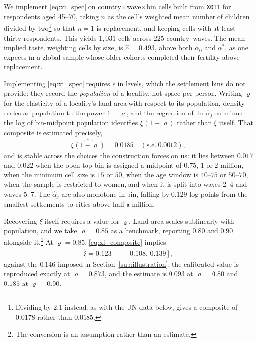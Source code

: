 \documentclass[11pt]{article}
\begin{document}
We implement \eqref{eq:xi_spec} on country$\times$wave$\times$bin cells built from \texttt{X011}
for respondents aged 45--70, taking $n$ as the cell's weighted mean number of children divided by two\footnote{Dividing by
$2.1$ instead, as with the UN data below, gives a composite of $0.0178$ rather than $0.0185$.} so that
$n=1$ is replacement, and keeping cells with at least thirty respondents. This yields $1{,}031$
cells across $225$ country--waves. The mean implied taste, weighting cells by size, is $\hat\alpha=0.493$, above both
$\alpha_0$ and $\alpha^{\ast}$, as one expects in a global sample whose older cohorts completed
their fertility above replacement.

Implementing \eqref{eq:xi_spec} requires $\epsilon$ in levels, which the settlement bins do not
provide: they record the \emph{population} of a locality, not space per person. Writing
$\varrho$ for the elasticity of a locality's land area with respect to its population, density scales
as population to the power $1-\varrho$, and the regression of $\ln\hat\alpha_j$ on minus the log of
bin-midpoint population identifies $\xi(1-\varrho)$ rather than $\xi$ itself. That composite is
estimated precisely,
\begin{align}
\widehat{\xi(1-\varrho)}=0.0185\quad(\text{s.e.}\ 0.0012),
\label{eq:xi_composite}
\end{align}
and is stable across the choices the construction forces on us: it lies between $0.017$ and $0.022$
when the open top bin is assigned a midpoint of $0.75$, $1$ or $2$ million, when the minimum cell
size is $15$ or $50$, when the age window is $40$--$75$ or $50$--$70$, when the sample is restricted
to women, and when it is split into waves 2--4 and waves 5--7. The $\hat\alpha_j$ are also monotone
in bin, falling by $0.129$ log points from the smallest settlements to cities above half a million.

Recovering $\xi$ itself requires a value for $\varrho$. Land area scales sublinearly with population,
and we take $\varrho=0.85$ as a benchmark, reporting $0.80$ and $0.90$ alongside it.\footnote{The
conversion is an assumption rather than an estimate.} At $\varrho=0.85$, \eqref{eq:xi_composite}
implies
\begin{align}
\hat\xi=0.123\qquad[0.108,\,0.139],
\label{eq:xi_estimate}
\end{align}
against the $0.146$ imposed in Section~\ref{sub:illustration}; the calibrated value is reproduced
exactly at $\varrho=0.873$, and the estimate is $0.093$ at $\varrho=0.80$ and $0.185$ at
$\varrho=0.90$.
\end{document}
